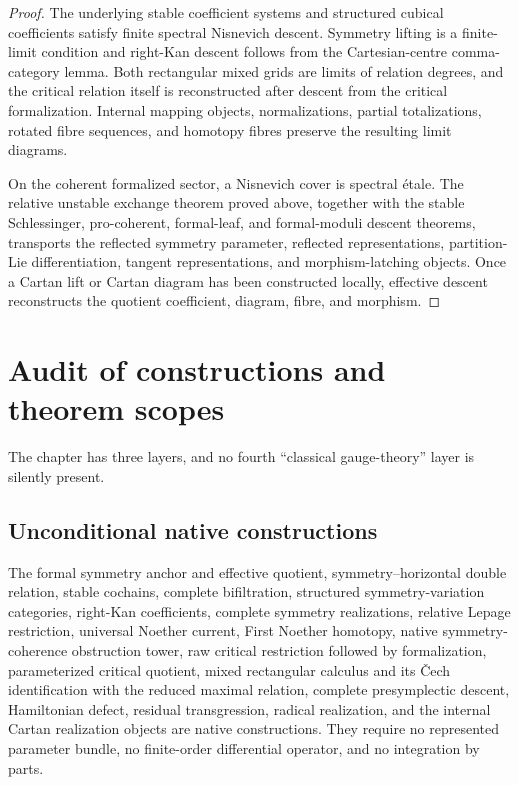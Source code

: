 \begin{proof}
The underlying stable coefficient systems and structured cubical coefficients
satisfy finite spectral Nisnevich descent.  Symmetry lifting is a finite-limit
condition and right-Kan descent follows from the Cartesian-centre comma-category
lemma.  Both rectangular mixed grids are limits of relation degrees, and the
critical relation itself is reconstructed after descent from the critical
formalization.  Internal mapping objects, normalizations, partial totalizations,
rotated fibre sequences, and homotopy fibres preserve the resulting limit diagrams.

On the coherent formalized sector, a Nisnevich cover is spectral \'etale.  The
relative unstable exchange theorem proved above, together with the stable
Schlessinger, pro-coherent, formal-leaf, and formal-moduli descent theorems,
transports the reflected symmetry parameter, reflected
representations, partition-Lie differentiation, tangent representations, and
morphism-latching objects.  Once a Cartan lift or Cartan diagram has been constructed locally, effective
descent reconstructs the quotient coefficient, diagram, fibre, and morphism.
\end{proof}
\section{Audit of constructions and theorem scopes}
\label{sec:symmetry-noether-audit-of-constructions-and-theorem-scopes}

The chapter has three layers, and no fourth ``classical gauge-theory'' layer is
silently present.

\subsection{Unconditional native constructions}
\label{subsec:symmetry-noether-unconditional-native-constructions}

The formal symmetry anchor and effective quotient, symmetry--horizontal double
relation, stable cochains, complete bifiltration, structured symmetry-variation
categories, right-Kan coefficients, complete symmetry realizations, relative
Lepage restriction, universal Noether current, First Noether homotopy, native
symmetry-coherence obstruction tower, raw critical restriction followed by
formalization, parameterized critical quotient, mixed rectangular calculus and its
\v{C}ech identification with the reduced maximal relation, complete presymplectic
descent, Hamiltonian defect, residual transgression, radical realization, and the
internal Cartan realization objects are native constructions.  They require no represented
parameter bundle, no finite-order differential operator, and no integration by
parts.

